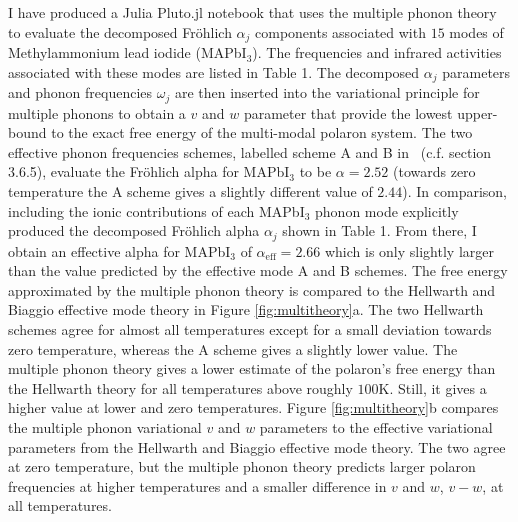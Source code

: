 I have produced a Julia Pluto.jl notebook that uses the multiple phonon theory to evaluate the decomposed Fr\"ohlich $\alpha_j$ components associated with $15$ modes of Methylammonium lead iodide (MAPbI$_3$). The frequencies and infrared activities associated with these modes are listed in Table 1. The decomposed $\alpha_j$ parameters and phonon frequencies $\omega_j$ are then inserted into the variational principle for multiple phonons to obtain a $v$ and $w$ parameter that provide the lowest upper-bound to the exact free energy of the multi-modal polaron system. The two effective phonon frequencies schemes, labelled scheme A and B in~\cite{hellwarth_mobility_1999} (c.f. section 3.6.5), evaluate the Fr\"ohlich alpha for MAPbI$_3$ to be $\alpha = 2.52$ (towards zero temperature the A scheme gives a slightly different value of $2.44$). In comparison, including the ionic contributions of each MAPbI$_3$ phonon mode explicitly produced the decomposed Fr\"ohlich alpha $\alpha_j$ shown in Table 1. From there, I obtain an effective alpha for MAPbI$_3$ of $\alpha_{\text{eff}} = 2.66$ which is only slightly larger than the value predicted by the effective mode A and B schemes. The free energy approximated by the multiple phonon theory is compared to the Hellwarth and Biaggio effective mode theory in Figure \ref{fig:multitheory}a. The two Hellwarth schemes agree for almost all temperatures except for a small deviation towards zero temperature, whereas the A scheme gives a slightly lower value. The multiple phonon theory gives a lower estimate of the polaron's free energy than the Hellwarth theory for all temperatures above roughly $100$K. Still, it gives a higher value at lower and zero temperatures. Figure \ref{fig:multitheory}b compares the multiple phonon variational $v$ and $w$ parameters to the effective variational parameters from the Hellwarth and Biaggio effective mode theory. The two agree at zero temperature, but the multiple phonon theory predicts larger polaron frequencies at higher temperatures and a smaller difference in $v$ and $w$, $v - w$, at all temperatures. 

